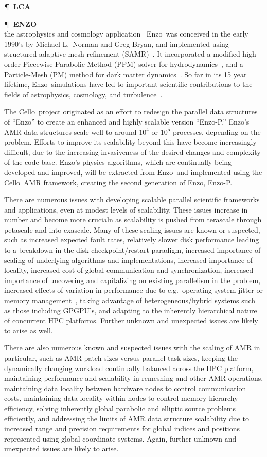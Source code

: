 \documentclass[11pt,letterpaper]{article}
\newcommand{\devel}[1]{\textbf{#1}}
\newcommand{\pargraph}[1]{\devel{\P\ \textbf{#1} \\}}
\newcommand{\cello}{\textsf{Cello}}
\newcommand{\enzo}{\textsf{Enzo}}
\newcommand{\enzoii}{\textsf{Enzo-P}}
\begin{document}
\pargraph{LCA}

\pargraph{ENZO} the astrophysics and cosmology application
~\cite{OsBr04}\enzo\ was conceived in the early 1990's by Michael
L.~Norman and Greg Bryan, and implemented using structured adaptive
mesh refinement (SAMR)~\cite{BeCo89}.  It incorporated a modified
high-order Piecewise Parabolic Method (PPM) solver for
hydrodynamics~\cite{WoCo84b}, and a Particle-Mesh (PM) method for dark
matter dynamics~\cite{HoEa88}.  So far in its 15 year lifetime, \enzo\
simulations have led to important scientific contributions to the
fields of astrophysics, cosmology, and
turbulence~\cite{@@@enzo-science}.

The \cello\ project originated as an effort to redesign the parallel
data structures of ``\enzo'' to create an enhanced and highly scalable
version ``\enzoii.''  \enzo's AMR data structures scale well to around
$10^4$ or $10^5$ processes, depending on the problem.  Efforts to
improve its scalability beyond this have become increasingly
difficult, due to the increasing invasiveness of the desired changes
and complexity of the code base.  \enzo's physics algorithms, which
are continually being developed and improved, will be extracted from
\enzo\ and implemented using the \cello\ AMR framework, creating the
second generation of \enzo, \enzoii.

There are numerous issues with developing scalable parallel scientific
frameworks and applications, even at modest levels of scalability.
These issues increase in number and become more crucialn as
scalability is pushed from terascale through petascale and into
exascale.  Many of these scaling issues are known or suspected, such
as increased expected fault rates, relatively slower disk performance
leading to a breakdown in the disk checkpoint/restart paradigm,
increased importance of scaling of underlying algorithms and
implementations, increased importance of locality, increased cost of
global communication and synchronization, increased importance of
uncovering and capitalizing on existing parallelism in the problem,
increased effects of variation in performance due to e.g.~operating
system jitter or memory management~\cite{StSh09}, taking advantage of
heterogeneous/hybrid systems such as those including GPGPU's, and
adapting to the inherently hierarchical nature of concurrent HPC
platforms.  Further unknown and unexpected issues are likely to arise
as well.

There are also numerous known and suspected issues with the scaling of
AMR in particular, such as AMR patch sizes versus parallel task sizes,
keeping the dynamically changing workload continually balanced across
the HPC platform, maintaining performance and scalability in remeshing
and other AMR operations, maintaining data locality between hardware
nodes to control communication costs, maintaining data locality within
nodes to control memory hierarchy efficiency, solving inherently
global parabolic and elliptic source problems efficiently, and
addressing the limits of AMR data structure scalability due to
increased range and precision requirements for global indices and
positions represented using global coordinate systems.  Again, further
unknown and unexpected issues are likely to arise.
\end{document}
